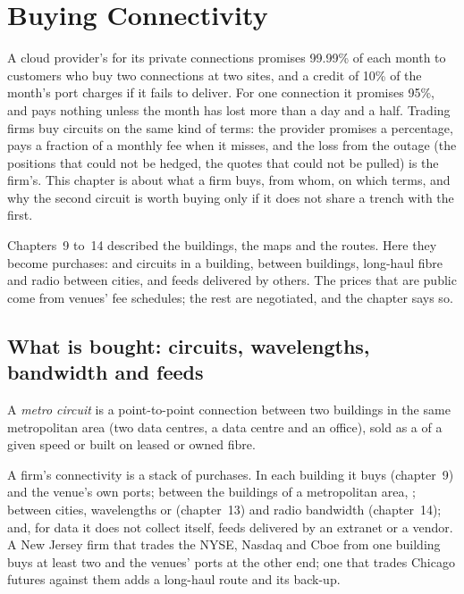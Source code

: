 \chapter{Buying Connectivity}\label{ch:nw:buying-connectivity}

A cloud provider's  for its private connections promises 99.99\% of each month to customers who buy two
connections at two sites, and a credit of 10\% of the month's port charges if it fails to deliver. For one connection it promises 95\%, and
pays nothing unless the month has lost more than a day and a half. Trading firms buy circuits on the same kind of terms: the provider
promises a percentage, pays a fraction of a monthly fee when it misses, and the loss from the outage (the positions that could not be
hedged, the quotes that could not be pulled) is the firm's. This chapter is about what a firm buys, from whom, on which terms, and why the
second circuit is worth buying only if it does not share a trench with the first.

Chapters~9 to~14 described the buildings, the maps and the routes. Here they become purchases:  and circuits in a
building,  between buildings, long-haul fibre and radio between cities, and feeds delivered by others. The prices that are
public come from venues' fee schedules; the rest are negotiated, and the chapter says so.

\section{What is bought: circuits, wavelengths, bandwidth and feeds}

\begin{definition}\label{def:nw:buying-connectivity:metro}
A \emph{metro circuit} is a point-to-point connection between two buildings in the same metropolitan area (two data centres,
a data centre and an office), sold as a  of a given speed or built on leased or owned fibre.
\end{definition}

A firm's connectivity is a stack of purchases. In each building it buys  (chapter~9) and the venue's own ports; between the
buildings of a metropolitan area, ; between cities, wavelengths or  (chapter~13) and radio bandwidth
(chapter~14); and, for data it does not collect itself, feeds delivered by an extranet or a vendor. A New Jersey firm that trades
the NYSE, Nasdaq and Cboe from one building buys at least two  and the venues' ports at the other end; one that trades
Chicago futures against them adds a long-haul route and its back-up.

